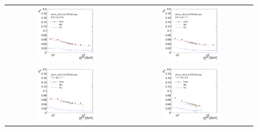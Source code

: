 \begin{figure}[!htp]
  \centering
  \begin{tabular}{cc}
                \includegraphics[width=0.49\textwidth]{figures/Extrapol_Eta0_final_nominal_v4.pdf} &
                \includegraphics[width=0.49\textwidth]{figures/Extrapol_Eta1_final_nominal_v4.pdf} \\
                \includegraphics[width=0.49\textwidth]{figures/Extrapol_Eta2_final_nominal_v4.pdf} &
                \includegraphics[width=0.49\textwidth]{figures/Extrapol_Eta3_final_nominal_v4.pdf} \\

\end{tabular}
\end{figure}

